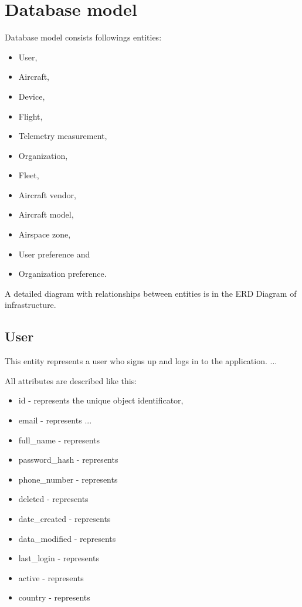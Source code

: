 \section{Database model}\label{sec:database-model}
Database model consists followings entities:
\begin{itemize}
    \item User,
    \item Aircraft,
    \item Device,
    \item Flight,
    \item Telemetry measurement,
    \item Organization,
    \item Fleet,
    \item Aircraft vendor,
    \item Aircraft model,
    \item Airspace zone,
    \item User preference and
    \item Organization preference.
\end{itemize}
A detailed diagram with relationships between entities is in the ERD Diagram of infrastructure\cite{fig:erd-diagram}.

\subsection{User}\label{subsec:user}
This entity represents a user who signs up and logs in to the application.
...

All attributes are described like this:
\begin{itemize}
    \item id - represents the unique object identificator,
    \item email - represents ...
    \item full\_name - represents
    \item password\_hash - represents
    \item phone\_number - represents
    \item deleted - represents
    \item date\_created - represents
    \item data\_modified - represents
    \item last\_login - represents
    \item active - represents
    \item country - represents
\end{itemize}

